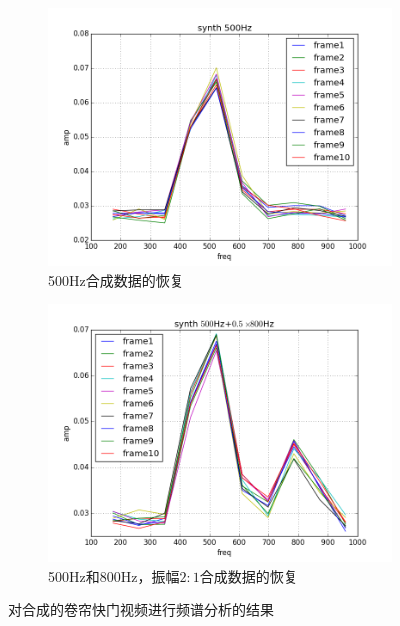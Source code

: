 \begin{figure}[h!]\begin{center}
    \begin{subfigure}[b]{.5\figwidth}
        \includegraphics[width=.5\figwidth]{res/synth-500.png}
        \caption{500Hz合成数据的恢复}
    \end{subfigure}
    \begin{subfigure}[b]{.5\figwidth}
        \includegraphics[width=.5\figwidth]{res/synth-500+800.png}
        \caption{500Hz和800Hz，振幅$2:1$合成数据的恢复}
        \label{fig:synth:500+800}
    \end{subfigure}
    \caption{对合成的卷帘快门视频进行频谱分析的结果}
    \label{fig:synth-local}
\end{center}\end{figure}

